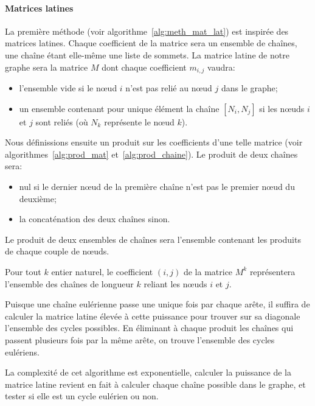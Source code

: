     \paragraph{Matrices latines}
      La première méthode (voir algorithme~\ref{alg:meth_mat_lat}) est inspirée
      des matrices latines. Chaque coefficient de la matrice sera un ensemble
      de chaînes, une chaîne étant elle-même une liste de sommets. La matrice
      latine de notre graphe sera la matrice $M$ dont chaque coefficient
      $m_{i,j}$ vaudra:
      \begin{itemize}
        \item l'ensemble vide si le nœud $i$ n'est pas relié au nœud $j$ dans
          le graphe;
        \item un ensemble contenant pour unique élément la chaîne  $[N_i,N_j]$
          si les nœuds $i$ et $j$ sont reliés (où $N_k$ représente le nœud
          $k$).
      \end{itemize}

      Nous définissions ensuite un produit sur les coefficients d'une telle
      matrice (voir algorithmes~\ref{alg:prod_mat} et~\ref{alg:prod_chaine}). Le
      produit de deux chaînes sera:
      \begin{itemize}
        \item nul si le dernier nœud de la première chaîne n'est pas le premier
          nœud du deuxième;
        \item la concaténation des deux chaînes sinon.
      \end{itemize}

      Le produit de deux ensembles de chaînes sera l'ensemble contenant les
      produits de chaque couple de nœuds.

      Pour tout $k$ entier naturel, le coefficient $(i,j)$ de la matrice $M^k$
      représentera l'ensemble des chaînes de longueur $k$ reliant les nœuds $i$
      et $j$.

      Puisque une chaîne eulérienne passe une unique fois par chaque arête, il
      suffira de calculer la matrice latine élevée à cette puissance pour
      trouver sur sa diagonale l'ensemble des cycles possibles. En éliminant à
      chaque produit les chaînes qui passent plusieurs fois par la même arête,
      on trouve l'ensemble des cycles eulériens.

      La complexité de cet algorithme est exponentielle, calculer la puissance
      de la matrice latine revient en fait à calculer chaque chaîne possible dans
      le graphe, et tester si elle est un cycle eulérien ou non.

